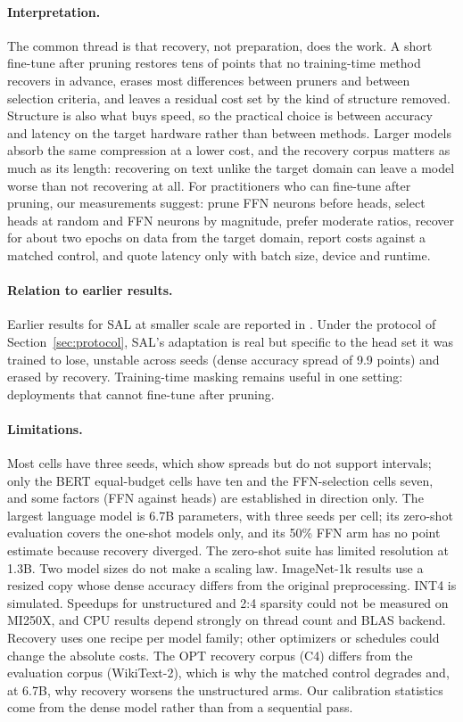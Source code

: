 \documentclass[11pt,a4paper]{article}
\begin{document}
\paragraph{Interpretation.} The common thread is that recovery, not preparation, does the work. A short fine-tune after pruning restores tens of points that no training-time method recovers in advance, erases most differences between pruners and between selection criteria, and leaves a residual cost set by the kind of structure removed. Structure is also what buys speed, so the practical choice is between accuracy and latency on the target hardware rather than between methods. Larger models absorb the same compression at a lower cost, and the recovery corpus matters as much as its length: recovering on text unlike the target domain can leave a model worse than not recovering at all. For practitioners who can fine-tune after pruning, our measurements suggest: prune FFN neurons before heads, select heads at random and FFN neurons by magnitude, prefer moderate ratios, recover for about two epochs on data from the target domain, report costs against a matched control, and quote latency only with batch size, device and runtime.

\paragraph{Relation to earlier results.} Earlier results for SAL at smaller scale are reported in \cite{martinventi2026salpreprint}. Under the protocol of Section~\ref{sec:protocol}, SAL's adaptation is real but specific to the head set it was trained to lose, unstable across seeds (dense accuracy spread of 9.9 points) and erased by recovery. Training-time masking remains useful in one setting: deployments that cannot fine-tune after pruning.

\paragraph{Limitations.} Most cells have three seeds, which show spreads but do not support intervals; only the BERT equal-budget cells have ten and the FFN-selection cells seven, and some factors (FFN against heads) are established in direction only. The largest language model is 6.7B parameters, with three seeds per cell; its zero-shot evaluation covers the one-shot models only, and its 50\% FFN arm has no point estimate because recovery diverged. The zero-shot suite has limited resolution at 1.3B. Two model sizes do not make a scaling law. ImageNet-1k results use a resized copy whose dense accuracy differs from the original preprocessing. INT4 is simulated. Speedups for unstructured and 2:4 sparsity could not be measured on MI250X, and CPU results depend strongly on thread count and BLAS backend. Recovery uses one recipe per model family; other optimizers or schedules could change the absolute costs. The OPT recovery corpus (C4) differs from the evaluation corpus (WikiText-2), which is why the matched control degrades and, at 6.7B, why recovery worsens the unstructured arms. Our calibration statistics come from the dense model rather than from a sequential pass.
\end{document}
